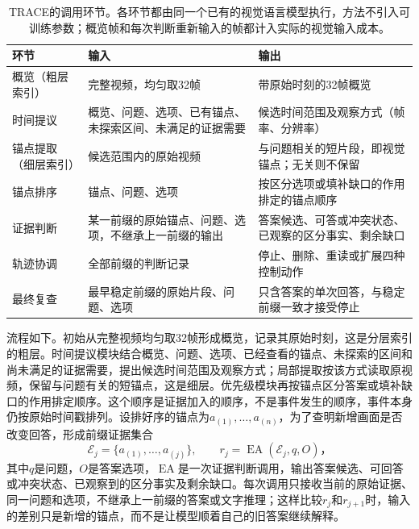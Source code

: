 \begin{table}[tbp]
  \centering
  \small
  \begin{tabularx}{\linewidth}{@{}lXX@{}}
    \toprule
    环节 & 输入 & 输出\\
    \midrule
    概览（粗层索引） & 完整视频，均匀取32帧 & 带原始时刻的32帧概览\\
    时间提议 & 概览、问题、选项、已有锚点、未探索区间、未满足的证据需要 & 候选时间范围及观察方式（帧率、分辨率）\\
    锚点提取（细层索引） & 候选范围内的原始视频 & 与问题相关的短片段，即视觉锚点；无关则不保留\\
    锚点排序 & 锚点、问题、选项 & 按区分选项或填补缺口的作用排定的锚点顺序\\
    证据判断 & 某一前缀的原始锚点、问题、选项，不继承上一前缀的输出 & 答案候选、可答或冲突状态、已观察的区分事实、剩余缺口\\
    轨迹协调 & 全部前缀的判断记录 & 停止、删除、重读或扩展四种控制动作\\
    最终复查 & 最早稳定前缀的原始片段、问题、选项 & 只含答案的单次回答，与稳定前缀一致才接受停止\\
    \bottomrule
  \end{tabularx}
  \caption{TRACE的调用环节。各环节都由同一个已有的视觉语言模型执行，方法不引入可训练参数；概览帧和每次判断重新输入的帧都计入实际的视觉输入成本。}
  \label{tab:vision-video-trace-components}
\end{table}

流程如下。初始从完整视频均匀取32帧形成概览，记录其原始时刻，这是分层索引的粗层。时间提议模块结合概览、问题、选项、已经查看的锚点、未探索的区间和尚未满足的证据需要，提出候选时间范围及观察方式；局部提取按该方式读取原视频，保留与问题有关的短锚点，这是细层。优先级模块再按锚点区分答案或填补缺口的作用排定顺序。这个顺序是证据加入的顺序，不是事件发生的顺序，事件本身仍按原始时间戳排列。设排好序的锚点为$a_{(1)},\ldots,a_{(n)}$，为了查明新增画面是否改变回答，形成前缀证据集合
\begin{equation}
  \mathcal{E}_j=\{a_{(1)},\ldots,a_{(j)}\},
  \qquad
  r_j=\operatorname{EA}(\mathcal{E}_j,q,O)\text{，}
  \label{eq:vision-video-trace-prefix}
\end{equation}
其中$q$是问题，$O$是答案选项，$\operatorname{EA}$是一次证据判断调用，输出答案候选、可回答或冲突状态、已观察到的区分事实及剩余缺口。每次调用只接收当前的原始证据、同一问题和选项，不继承上一前缀的答案或文字推理；这样比较$r_j$和$r_{j+1}$时，输入的差别只是新增的锚点，而不是让模型顺着自己的旧答案继续解释。

